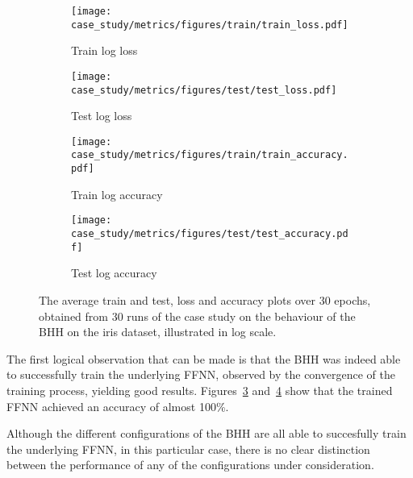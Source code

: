 \begin{figure}[htb]
      \begin{subfigure}{0.5\textwidth}
            \centering
            \texttt{[image: case\_study/metrics/figures/train/train\_loss.pdf]}
            \caption{Train log loss}
            \label{fig:results:case_study:metrics:train_loss}
      \end{subfigure}
      \begin{subfigure}{0.5\textwidth}
            \centering
            \texttt{[image: case\_study/metrics/figures/test/test\_loss.pdf]}
            \caption{Test log loss}
            \label{fig:results:case_study:metrics:test_loss}
      \end{subfigure}
      \par\bigskip
      \begin{subfigure}{0.5\textwidth}
            \centering
            \texttt{[image: case\_study/metrics/figures/train/train\_accuracy.pdf]}
            \caption{Train log accuracy}
            \label{fig:results:case_study:metrics:train_accuracy}
      \end{subfigure}
      \begin{subfigure}{0.5\textwidth}
            \centering
            \texttt{[image: case\_study/metrics/figures/test/test\_accuracy.pdf]}
            \caption{Test log accuracy}
            \label{fig:results:case_study:metrics:test_accuracy}
      \end{subfigure}
      \par\bigskip
      \caption{The average train and test, loss and accuracy plots over 30 epochs, obtained from 30 runs of the case study on the behaviour of the \acs{BHH} on the iris dataset, illustrated in log scale.}
      \label{fig:results:case_study:metrics}
\end{figure}

The first logical observation that can be made is that the \acs{BHH} was indeed able to successfully train the underlying \acs{FFNN}, observed by the convergence of the training process, yielding good results. Figures~\ref{fig:results:case_study:metrics:train_accuracy} and~\ref{fig:results:case_study:metrics:test_accuracy} show that the trained \acs{FFNN} achieved an accuracy of almost 100\%.

Although the different configurations of the \acs{BHH} are all able to succesfully train the underlying \acs{FFNN}, in this particular case, there is no clear distinction between the performance of any of the configurations under consideration.

